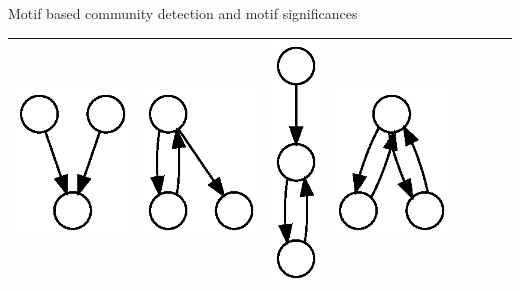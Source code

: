 \documentclass[unknownkeysallowed]{beamer}
\begin{document}
\begin{frame}{Motif based community detection and motif significances}
\begin{tabular}{l|lllllll}
    \includegraphics[height=0.10\textheight]{M10-plain} &
    \includegraphics[height=0.10\textheight]{M11-plain} &
    \includegraphics[height=0.10\textheight]{M12-plain} &
    \includegraphics[height=0.10\textheight]{M13-plain} & \\ \hline

\end{tabular}
\end{frame}
\end{document}
